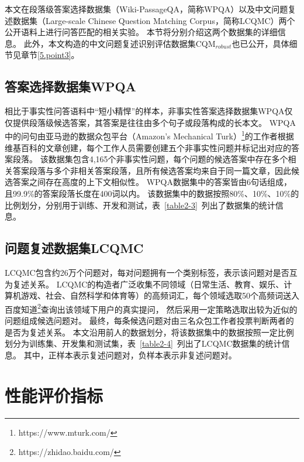 本文在段落级答案选择数据集（Wiki-PassageQA，简称WPQA）\cite{cohen2018wikipassageqa}以及中文问题复述数据集（Large-scale Chinese Question Matching Corpus，简称LCQMC）\cite{liu2018lcqmc}两个公开语料上进行问答匹配的相关实验。
本节将分别介绍这两个数据集的详细信息。
此外，本文构造的中文问题复述识别评估数据集CQM$_{robust}$也已公开，具体细节见章节\ref{5.point3}。

\subsection{答案选择数据集WPQA}

相比于事实性问答语料中“短小精悍”的样本，非事实性答案选择数据集WPQA仅仅提供段落级候选答案，其答案是往往由多个句子或段落构成的长本文。
WPQA中的问句由亚马逊的数据众包平台（Amazon’s Mechanical Turk）\footnote{https://www.mturk.com/}的工作者根据维基百科的文章创建，每个工作人员需要创建五个非事实性问题并标记出对应的答案段落。
该数据集包含4,165个非事实性问题，每个问题的候选答案中存在多个相关答案段落与多个非相关答案段落，且所有候选答案均来自于同一篇文章，因此候选答案之间存在高度的上下文相似性。
WPQA数据集中的答案皆由6句话组成，且99.9\%的答案段落长度在400词以内。
该数据集中的数据按照80\%、10\%、10\%的比例划分，分别用于训练、开发和测试，表~\ref{table2-3}~列出了数据集的统计信息。



\subsection{问题复述数据集LCQMC}


LCQMC包含约26万个问题对，每对问题拥有一个类别标签，表示该问题对是否互为复述关系。
LCQMC的构造者广泛收集不同领域（日常生活、教育、娱乐、计算机游戏、社会、自然科学和体育等）的高频词汇，每个领域选取50个高频词送入百度知道\footnote{https://zhidao.baidu.com/}查询出该领域下用户的真实提问，
然后采用一定策略选取出较为近似的问题组成候选问题对。
最终，每条候选问题对由三名众包工作者投票判断两者的是否为复述关系。
本文沿用前人的数据划分，将该数据集中的数据按照一定比例划分为训练集、开发集和测试集，表~\ref{table2-4}~列出了LCQMC数据集的统计信息。
其中，正样本表示复述问题对，负样本表示非复述问题对。



\section{性能评价指标}
\label{2.3 性能评价指标}

